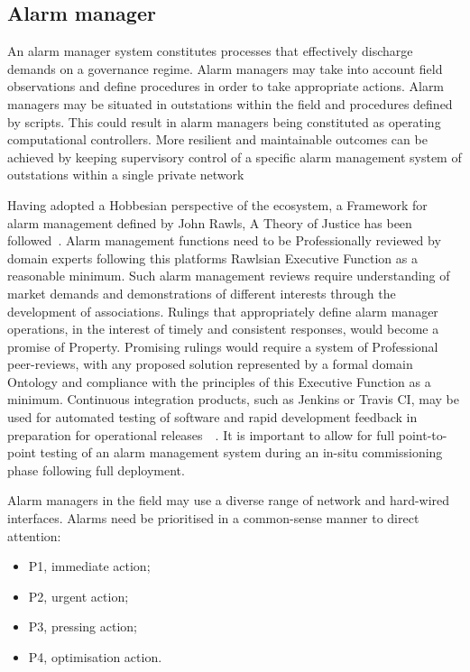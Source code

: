 \documentclass[11pt, oneside]{article}   	%
\begin{document}
\subsection{Alarm manager}
An alarm manager system constitutes processes that effectively discharge demands on a governance regime.
Alarm managers may take into account field observations and define procedures in order to take appropriate actions.
Alarm managers may be situated in outstations within the field and procedures defined by scripts.
This could result in alarm managers being constituted as operating computational controllers.
More resilient and maintainable outcomes can be achieved by keeping supervisory control of a specific alarm management system of outstations within a single private network\

Having adopted a Hobbesian perspective of the ecosystem, a Framework for alarm management defined by John Rawls, A Theory of Justice has been followed~\cite{jr1}.
Alarm management functions need to be Professionally reviewed by domain experts following this platforms Rawlsian Executive Function as a reasonable minimum.
Such alarm management reviews require understanding of market demands and demonstrations of different interests through the development of associations.
Rulings that appropriately define alarm manager operations, in the interest of timely and consistent responses, would become a promise of Property.
Promising rulings would require a system of Professional peer-reviews, with any proposed solution represented by a formal domain Ontology and compliance with the principles of this Executive Function as a minimum.
Continuous integration products, such as Jenkins or Travis CI, may be used for automated testing of software and rapid development feedback in preparation for operational releases~\cite{jenkins}~\cite{travis}.
It is important to allow for full point-to-point testing of an alarm management system during an in-situ commissioning phase following full deployment.\

Alarm managers in the field may use a diverse range of network and hard-wired interfaces.
Alarms need be prioritised in a common-sense manner to direct attention:
\begin{itemize}
	\item P1, immediate action; 
	\item P2, urgent action;
	\item P3, pressing action;
	\item P4, optimisation action.
\end{itemize}
\end{document}
